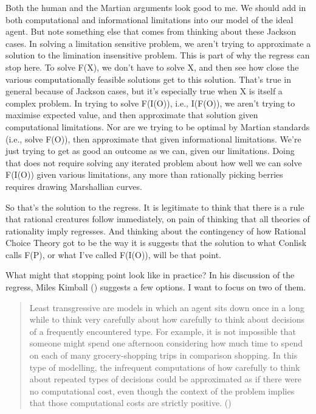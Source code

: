 \documentclass[
  12pt,
  letterpaper,
]{scrbook}
\begin{document}
Both the human and the Martian arguments look good to me. We should add
in both computational and informational limitations into our model of
the ideal agent. But note something else that comes from thinking about
these Jackson cases. In solving a limitation sensitive problem, we
aren't trying to approximate a solution to the limination insensitive
problem. This is part of why the regress can stop here. To solve F(X),
we don't have to solve X, and then see how close the various
computationally feasible solutions get to this solution. That's true in
general because of Jackson cases, but it's especially true when X is
itself a complex problem. In trying to solve F(I(O)), i.e., I(F(O)), we
aren't trying to maximise expected value, and then approximate that
solution given computational limitations. Nor are we trying to be
optimal by Martian standards (i.e., solve F(O)), then approximate that
given informational limitations. We're just trying to get as good an
outcome as we can, given our limitations. Doing that does not require
solving any iterated problem about how well we can solve F(I(O)) given
various limitations, any more than rationally picking berries requires
drawing Marshallian curves.

So that's the solution to the regress. It is legitimate to think that
there is a rule that rational creatures follow immediately, on pain of
thinking that all theories of rationality imply regresses. And thinking
about the contingency of how Rational Choice Theory got to be the way it
is suggests that the solution to what Conlisk calls F(P), or what I've
called F(I(O)), will be that point.

What might that stopping point look like in practice? In his discussion
of the regress, Miles Kimball ()
suggests a few options. I want to focus on two of them.

\begin{quote}
Least transgressive are models in which an agent sits down once in a
long while to think very carefully about how carefully to think about
decisions of a frequently encountered type. For example, it is not
impossible that someone might spend one afternoon considering how much
time to spend on each of many grocery-shopping trips in comparison
shopping. In this type of modelling, the infrequent computations of how
carefully to think about repeated types of decisions could be
approximated as if there were no computational cost, even though the
context of the problem implies that those computational costs are
strictly positive. ()
\end{quote}
\end{document}
